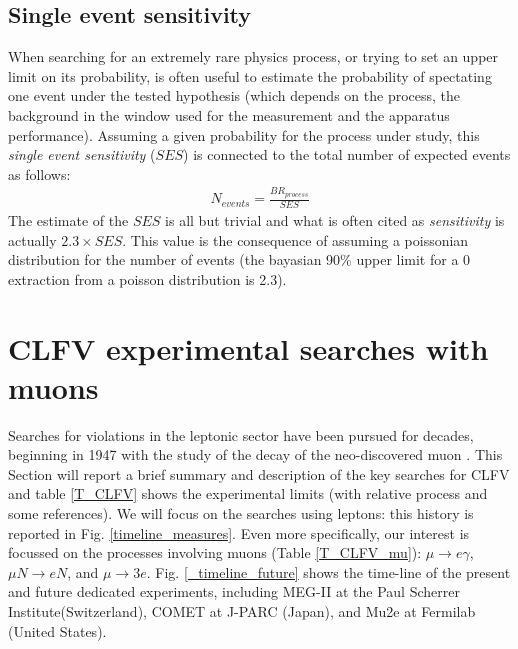 \documentclass[12pt,a4paper,openright, oneside, titlepage]{book} %
\begin{document}
\subsection{Single event sensitivity}
When searching for an extremely rare physics process, 
or trying to set an upper limit on its probability, 
is often useful to estimate the probability of spectating one event 
under the tested hypothesis 
(which depends on the process, the background in the window used for the measurement 
and the apparatus performance). 
Assuming a given probability for the process under study, 
this \textit{single event sensitivity} ($SES$) is connected to the total number of expected events as follows:
\begin{align*}
N_{events} = \frac{BR_{process}}{SES}
\end{align*}
The estimate of the $SES$ is all but trivial 
and what is often cited as \textit{sensitivity} is actually $2.3\times SES$. 
This value is the consequence of assuming a poissonian distribution 
for the number of events (the bayasian 90\% upper limit for a 0 extraction from a poisson distribution is 2.3).\\

\section{CLFV experimental searches with muons}
Searches for violations in the leptonic sector have been pursued for decades, 
beginning in 1947 \cite{ConvPancPicc} with the study of the decay of the neo-discovered muon \cite{Anderson}.
This Section will report a brief summary and description 
of the key searches for CLFV and table \ref{T_CLFV} shows the experimental limits 
(with relative process and some references). 
We will focus on the searches using leptons: 
this history is reported in  Fig. \ref{timeline_measures}. 
Even more specifically, our interest is focussed on the processes involving muons 
(Table \ref{T_CLFV_mu}): $\mu\rightarrow e\gamma$, $\mu N\rightarrow e N$, and $\mu\rightarrow 3e$.
Fig. \ref{_timeline_future} shows the time-line of the present and future dedicated experiments,
including MEG-II at the Paul Scherrer Institute(Switzerland), COMET at J-PARC (Japan),
and Mu2e at Fermilab (United States).
\end{document}
